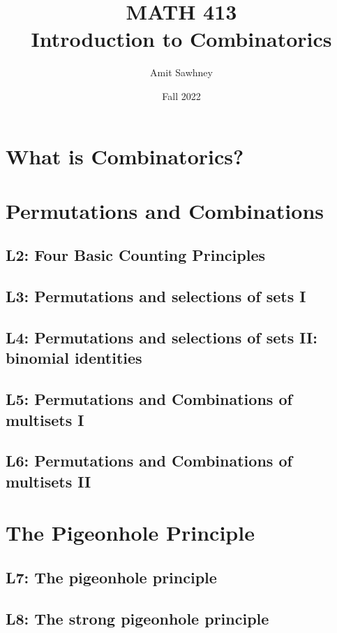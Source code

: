 \documentclass{report}
\title{\Huge{MATH 413}\\Introduction to Combinatorics}
\author{\huge{Amit Sawhney}}
\date{Fall 2022}
\begin{document}
\maketitle
\newpage%
\tableofcontents
\pagebreak

\chapter{What is Combinatorics?}

\chapter{Permutations and Combinations}

\section{L2: Four Basic Counting Principles}

\section{L3: Permutations and selections of sets I}

\section{L4: Permutations and selections of sets II: binomial identities}

\section{L5: Permutations and Combinations of multisets I}

\section{L6: Permutations and Combinations of multisets II}

\chapter{The Pigeonhole Principle}

\section{L7: The pigeonhole principle}

\section{L8: The strong pigeonhole principle}
\end{document}
